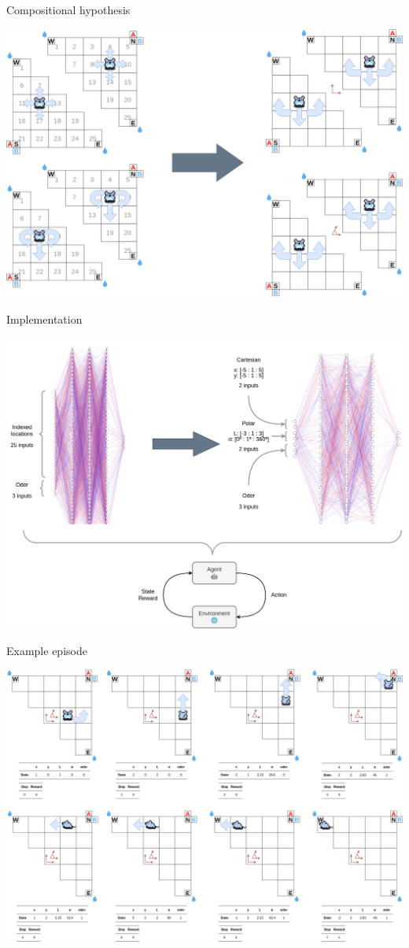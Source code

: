 \documentclass[bigger]{beamer}
\begin{document}
\begin{frame}[label={sec:org9e330bc}]{Compositional hypothesis}
\begin{center}
\includegraphics[width=.9\linewidth]{img/env_new-triangle-task.drawio.png}
\end{center}
\end{frame}
\begin{frame}[label={sec:org40b847a}]{Implementation}
\begin{center}
\includegraphics[width=.9\linewidth]{img/nn.drawio.png}
\end{center}
\end{frame}
\begin{frame}[label={sec:orge31336d}]{Example episode}
\begin{center}
\includegraphics[width=.9\linewidth]{img/env_new-steps.drawio.png}
\end{center}
\end{frame}
\end{document}
